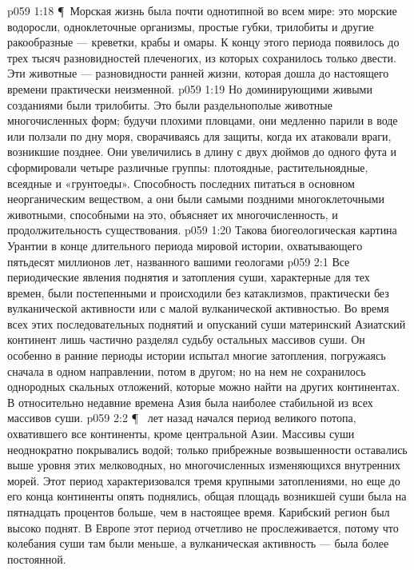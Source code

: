 \vs p059 1:18 \P\ Морская жизнь была почти однотипной во всем мире: это морские водоросли, одноклеточные организмы, простые губки, трилобиты и другие ракообразные --- креветки, крабы и омары. К концу этого периода появилось до трех тысяч разновидностей плеченогих, из которых сохранилось только двести. Эти животные --- разновидности ранней жизни, которая дошла до настоящего времени практически неизменной.
\vs p059 1:19 Но доминирующими живыми созданиями были трилобиты. Это были раздельнополые животные многочисленных форм; будучи плохими пловцами, они медленно парили в воде или ползали по дну моря, сворачиваясь для защиты, когда их атаковали враги, возникшие позднее. Они увеличились в длину с двух дюймов до одного фута и сформировали четыре различные группы: плотоядные, растительноядные, всеядные и «грунтоеды». Способность последних питаться в основном неорганическим веществом, а они были самыми поздними многоклеточными животными, способными на это, объясняет их многочисленность, и продолжительность существования.
\vs p059 1:20 Такова биогеологическая картина Урантии в конце длительного периода мировой истории, охватывающего пятьдесят миллионов лет, названного вашими геологами 
\vs p059 2:1 Все периодические явления поднятия и затопления суши, характерные для тех времен, были постепенными и происходили без катаклизмов, практически без вулканической активности или с малой вулканической активностью. Во время всех этих последовательных поднятий и опусканий суши материнский Азиатский континент лишь частично разделял судьбу остальных массивов суши. Он особенно в ранние периоды истории испытал многие затопления, погружаясь сначала в одном направлении, потом в другом; но на нем не сохранилось однородных скальных отложений, которые можно найти на других континентах. В относительно недавние времена Азия была наиболее стабильной из всех массивов суши.
\vs p059 2:2 \P\  лет назад начался период великого потопа, охватившего все континенты, кроме центральной Азии. Массивы суши неоднократно покрывались водой; только прибрежные возвышенности оставались выше уровня этих мелководных, но многочисленных изменяющихся внутренних морей. Этот период характеризовался тремя крупными затоплениями, но еще до его конца континенты опять поднялись, общая площадь возникшей суши была на пятнадцать процентов больше, чем в настоящее время. Карибский регион был высоко поднят. В Европе этот период отчетливо не прослеживается, потому что колебания суши там были меньше, а вулканическая активность --- была более постоянной.
